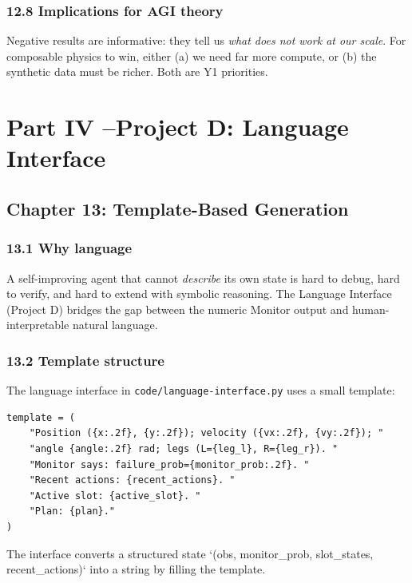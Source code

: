 \documentclass[11pt]{article}
\begin{document}
\subsubsection{12.8 Implications for AGI theory}

Negative results are informative: they tell us \textit{what does not work at our scale}.
For composable physics to win, either (a) we need far more compute, or (b) the
synthetic data must be richer. Both are Y1 priorities.

\hrulefill

\section{Part IV --Project D: Language Interface}

\subsection{Chapter 13: Template-Based Generation}

\subsubsection{13.1 Why language}

A self-improving agent that cannot \textit{describe} its own state is hard to debug,
hard to verify, and hard to extend with symbolic reasoning. The Language
Interface (Project D) bridges the gap between the numeric Monitor output and
human-interpretable natural language.

\subsubsection{13.2 Template structure}

The language interface in \texttt{code/language-interface.py} uses a small template:

\begin{verbatim}
template = (
    "Position ({x:.2f}, {y:.2f}); velocity ({vx:.2f}, {vy:.2f}); "
    "angle {angle:.2f} rad; legs (L={leg_l}, R={leg_r}). "
    "Monitor says: failure_prob={monitor_prob:.2f}. "
    "Recent actions: {recent_actions}. "
    "Active slot: {active_slot}. "
    "Plan: {plan}."
)
\end{verbatim}

The interface converts a structured state `(obs, monitor\_prob, slot\_states,
recent\_actions)` into a string by filling the template.
\end{document}
